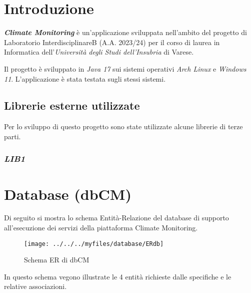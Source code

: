 \maketitle

\cleardoublepage
{}
{}
\tableofcontents

\listoffigures
\listoftables%
\lstlistoflistings

\chapter{Introduzione}
	\textsl{\textbf{Climate Monitoring}} \`e un'applicazione sviluppata nell’ambito del progetto di Laboratorio InterdisciplinareB (A.A. 2023/24) per il corso di laurea in Informatica dell’\textsl{Universit\`a degli Studi dell’Insubria} di Varese.
	
	Il progetto \`e sviluppato in \textsl{Java 17} sui sistemi operativi \textsl{Arch Linux} e \textsl{Windows 11}.
	L'applicazione \`e stata testata sugli stessi sistemi.
	\section{Librerie esterne utilizzate}
		Per lo sviluppo di questo progetto sono state utilizzate alcune librerie di terze parti.
	\subsection{\textsl{LIB1}}
\chapter{Database (dbCM)}
	Di seguito si mostra lo schema Entità-Relazione del database di supporto all’esecuzione dei servizi della piattaforma Climate Monitoring.
	
	\begin{figure}[h]
		\centering
		\caption{Schema ER di dbCM}
		\label{fig:erdb}
		\texttt{[image: ../../../myfiles/database/ERdb]}
	\end{figure}
	
	In questo schema vegono illustrate le 4 entità richieste dalle specifiche e le relative associazioni.
	
